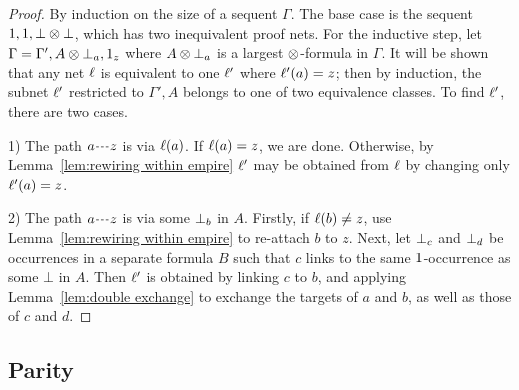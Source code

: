 \documentclass{sigplanconf-modified}
\begin{document}
\begin{proof}
By induction on the size of a sequent $\Gamma$.
%
The base case is the sequent $1,1,\bot\otimes\bot$, which has two inequivalent proof nets.
%
For the inductive step,
%
\color{red}
let $\Gamma=\Gamma',A\otimes\bot_{a},1_{z}$ where $A\otimes\bot_{a}$ is a largest $\otimes$-formula in $\Gamma$.
%
It will be shown that any net $\ell$ is equivalent to one $\ell'$ where $\ell'(a)=z$; then by induction, the subnet $\ell'$ restricted to $\Gamma',A$ belongs to one of two equivalence classes.
%
To find $\ell'$, there are two cases.

1) The path $\path az$ is via $\ell(a)$.
%
If $\ell(a)=z$, we are done. Otherwise, by Lemma~\ref{lem:rewiring within empire} $\ell'$ may be obtained from $\ell$ by changing only $\ell'(a)=z$.


2) The path $\path az$ is via some $\bot_{b}$ in $A$.
%
Firstly, if $\ell(b)\neq z$, use Lemma~\ref{lem:rewiring within empire} to re-attach $b$ to $z$.
%
Next, let $\bot_{c}$ and $\bot_{d}$ be occurrences in a separate formula $B$ such that $c$ links to the same $1$-occurrence as some $\bot$ in $A$.
%
Then $\ell'$ is obtained by linking $c$ to $b$, and applying Lemma~\ref{lem:double exchange} to exchange the targets of $a$ and $b$, as well as those of $c$ and $d$.
%
\end{proof}
\color{black}

%
%
%



\subsection*{Parity}
\end{document}

